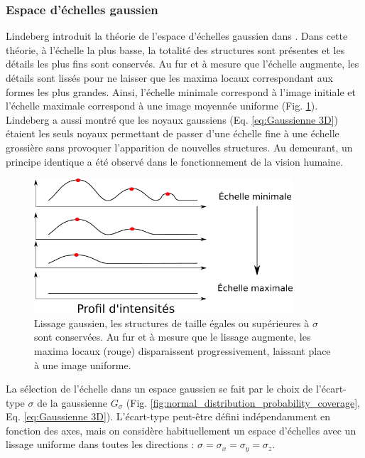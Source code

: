 \subsubsection{Espace d'échelles gaussien}
\label{sec:EA:rehaussement:echelle:gaussien}
Lindeberg introduit la théorie de l'espace d'échelles gaussien dans \cite{Lindeberg1994_scale}. Dans cette théorie, à l'échelle la plus basse, la totalité des structures sont présentes et les détails les plus fins sont conservés. Au fur et à mesure que l'échelle augmente, les détails sont lissés pour ne laisser que les maxima locaux correspondant aux formes les plus grandes. Ainsi, l'échelle minimale correspond à l'image initiale et l'échelle maximale correspond à une image moyennée uniforme (Fig. \ref{fig:gaussian_smoothing}). Lindeberg a aussi montré que les noyaux gaussiens (Eq. \ref{eq:Gaussienne 3D}) étaient les seuls noyaux permettant de passer d'une échelle fine à une échelle grossière sans provoquer l'apparition de nouvelles structures. Au demeurant, un principe identique a été observé dans le fonctionnement de la vision humaine.

\begin{figure}[!ht]
  \centering
  \includegraphics[height=5cm]{Images/gaussian_smoothing.png}
  \caption{Lissage gaussien, les structures de taille égales ou supérieures à $\sigma$ sont conservées. Au fur et à mesure que le lissage augmente, les maxima locaux (rouge) disparaissent progressivement, laissant place à une image uniforme.}
  \label{fig:gaussian_smoothing}
\end{figure}

La sélection de l'échelle dans un espace gaussien se fait par le choix de l'écart-type $\sigma$ de la gaussienne $G_\sigma$ (Fig. \ref{fig:normal_distribution_probability_coverage}, Eq. \ref{eq:Gaussienne 3D}). L'écart-type peut-être défini indépendamment en fonction des axes, mais on considère habituellement un espace d'échelles avec un lissage uniforme dans toutes les directions : $\sigma = \sigma_x = \sigma_y = \sigma_z$. 

